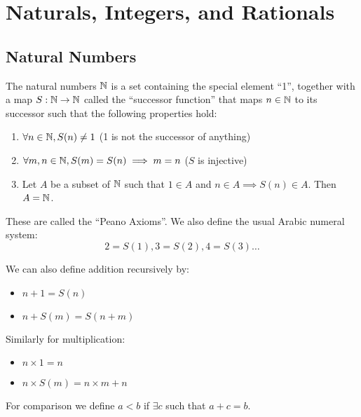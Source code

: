 \documentclass[../main.tex]{subfiles}
\begin{document}
\chapter{Naturals, Integers, and Rationals}
\section{Natural Numbers}
\begin{definition}
  The natural numbers $\mathbb{N}$ is a set containing the special element ``1'', together with a map $S: \mathbb{N} \to \mathbb{N}$ called the ``successor function'' that maps $n \in \mathbb{N}$ to its successor such that the following properties hold:
  \begin{enumerate}
    \item $\forall n \in \mathbb{N}, S(n) \neq 1$ (1 is not the successor of anything)
    \item $\forall m, n \in \mathbb{N}, S(m) = S(n) \implies m = n$ ($S$ is injective)
    \item Let $A$ be a subset of $\mathbb{N}$ such that $1 \in A$ and $n \in A \implies S(n) \in A$. Then $A = \mathbb{N}$.
  \end{enumerate}
\end{definition}
These are called the ``Peano Axioms''.
We also define the usual Arabic numeral system:
\[
  2 = S(1), 3 = S(2), 4 = S(3) \ldots
\]

We can also define addition recursively by:
\begin{itemize}
  \item $n + 1 = S(n)$
  \item $n + S(m) = S(n + m)$
\end{itemize}
Similarly for multiplication:
\begin{itemize}
  \item $n \times 1 = n$
  \item $n \times S(m) = n \times m + n$
\end{itemize}
For comparison we define $a < b$ if $\exists c$ such that $a + c = b$.
\end{document}
